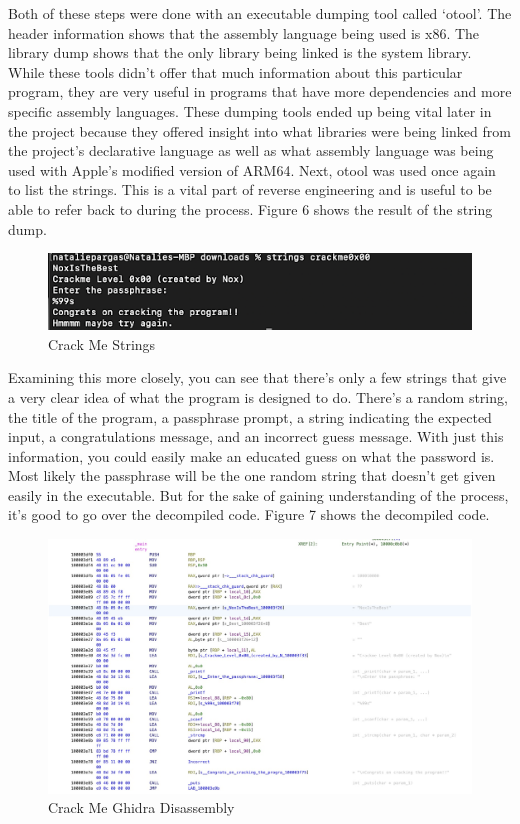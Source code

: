 Both of these steps were done with an executable dumping tool called ‘otool’. 
The header information shows that the assembly language being used is x86. 
The library dump shows that the only library being linked is the system library. 
While these tools didn’t offer that much information about this particular program, they are very useful in programs that have more dependencies and more specific assembly languages. 
These dumping tools ended up being vital later in the project because they offered insight into what libraries were being linked from the project's declarative language as well as what assembly language was being used with Apple’s modified version of ARM64. 
Next, otool was used once again to list the strings. 
This is a vital part of reverse engineering and is useful to be able to refer back to during the process. 
Figure 6 shows the result of the string dump.

\begin{figure}[h]
	\caption{Crack Me Strings}
	\includegraphics{crackmestrings.png}
\end{figure}

Examining this more closely, you can see that there’s only a few strings that give a very clear idea of what the program is designed to do. 
There’s a random string, the title of the program, a passphrase prompt, a string indicating the expected input, a congratulations message, and an incorrect guess message. 
With just this information, you could easily make an educated guess on what the password is. 
Most likely the passphrase will be the one random string that doesn’t get given easily in the executable. 
But for the sake of gaining understanding of the process, it’s good to go over the decompiled code. 
Figure 7 shows the decompiled code.

\begin{figure}[h]
	\caption{Crack Me Ghidra Disassembly}
	\includegraphics[scale=.3]{crackmeghidra.png}
\end{figure}

